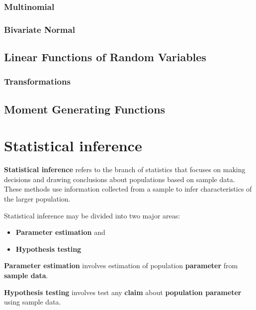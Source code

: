 \documentclass[
  11pt,
  letterpaper,
  DIV=11,
  numbers=noendperiod]{scrreprt}
\begin{document}
\subsection{Multinomial}\label{multinomial}

\subsection{Bivariate Normal}\label{bivariate-normal}

\section{Linear Functions of Random
Variables}\label{linear-functions-of-random-variables}

\subsection{Transformations}\label{transformations}

\section{Moment Generating Functions}\label{moment-generating-functions}


\chapter{Statistical inference}\label{statistical-inference}

\textbf{Statistical inference} refers to the branch of statistics that
focuses on making decisions and drawing conclusions about populations
based on sample data. These methods use information collected from a
sample to infer characteristics of the larger population.

Statistical inference may be divided into two major areas:

\begin{itemize}
\item
  \textbf{Parameter estimation} and
\item
  \textbf{Hypothesis testing}
\end{itemize}

\textbf{Parameter estimation} involves estimation of population
\textbf{parameter} from \textbf{sample data}.

\textbf{Hypothesis testing} involves test any \textbf{claim} about
\textbf{population parameter} using sample data.
\end{document}

